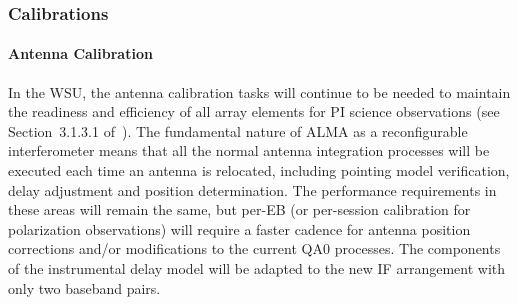 

\subsubsection{Calibrations}    %
\label{sec:calibrations}
\paragraph{Antenna Calibration}
\newcommand\offlineCalibration{3.1.3.3}

In the WSU, the antenna calibration tasks will continue to be needed 
to maintain the readiness and efficiency of all array elements for PI science 
observations (see Section~3.1.3.1 of~\cite{CSA-IA}).  The fundamental nature of ALMA as
a reconfigurable interferometer
means that all the normal antenna integration processes will be executed each time an antenna is relocated, including pointing model verification, delay adjustment and position determination.  The performance requirements in these areas will remain the same, but per-EB (or per-session calibration for polarization observations) will require a faster cadence for antenna position corrections and/or modifications to the current QA0 processes.
The components of the instrumental delay model will be adapted to the new IF arrangement with only two baseband pairs.  

